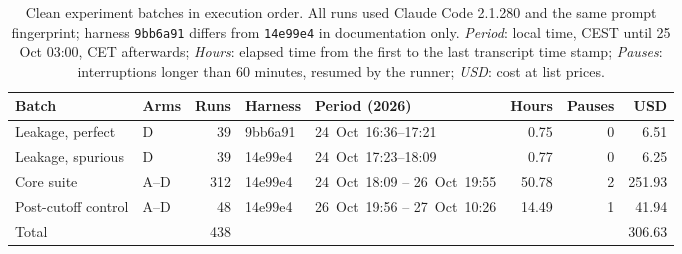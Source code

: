 \begin{table}[htbp]
  \centering
  \small
  \caption[Clean experiment batches]{Clean experiment batches in execution order. All runs used Claude Code 2.1.280 and the same prompt fingerprint; harness \texttt{9bb6a91} differs from \texttt{14e99e4} in documentation only. \emph{Period}: local time, CEST until 25 Oct 03:00, CET afterwards; \emph{Hours}: elapsed time from the first to the last transcript time stamp; \emph{Pauses}: interruptions longer than 60 minutes, resumed by the runner; \emph{USD}: cost at list prices.}
  \label{tab:5:batches}
  \begin{tabular}{llrl>{\RaggedRight\arraybackslash}p{2.9cm}rrr}
    \toprule
    Batch & Arms & Runs & Harness & Period (2026) & Hours & Pauses & USD \\
    \midrule
    Leakage, perfect & D & 39 & 9bb6a91 & \mbox{24 Oct 16:36--17:21} & 0.75 & 0 & 6.51 \\
    Leakage, spurious & D & 39 & 14e99e4 & \mbox{24 Oct 17:23--18:09} & 0.77 & 0 & 6.25 \\
    Core suite & A--D & 312 & 14e99e4 & \mbox{24 Oct 18:09} -- \mbox{26 Oct 19:55} & 50.78 & 2 & 251.93 \\
    Post-cutoff control & A--D & 48 & 14e99e4 & \mbox{26 Oct 19:56} -- \mbox{27 Oct 10:26} & 14.49 & 1 & 41.94 \\
    \midrule
    Total &  & 438 &  &  &  &  & 306.63 \\
    \bottomrule
  \end{tabular}
\end{table}
